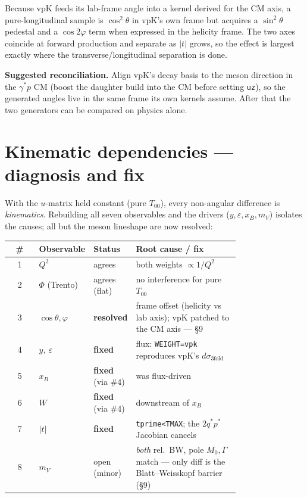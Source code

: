 \documentclass[11pt]{article}
\newcommand{\shadebox}[2][shade]{%
  \begingroup\setlength{\fboxsep}{10pt}%
  \noindent\colorbox{#1}{\parbox{\dimexpr\linewidth-2\fboxsep\relax}{#2}}%
  \endgroup\par\vspace{0.6em}}
\begin{document}
Because vpK feeds its lab-frame angle into a kernel derived for the CM axis, a pure-longitudinal sample is
$\cos^2\!\theta$ in vpK's own frame but acquires a $\sin^2\!\theta$ pedestal and a $\cos2\varphi$ term when
expressed in the helicity frame. The two axes coincide at forward production and separate as $|t|$ grows, so
the effect is largest exactly where the transverse/longitudinal separation is done.

\shadebox{\textbf{Suggested reconciliation.} Align vpK's decay basis to the meson direction in the
$\gamma^{*}p$ CM (boost the daughter build into the CM before setting \texttt{uz}), so the generated angles
live in the same frame its own kernels assume. After that the two generators can be compared on physics
alone.}

\section{Kinematic dependencies --- diagnosis and fix}
With the $u$-matrix held constant (pure $T_{00}$), every non-angular difference is \emph{kinematics}.
Rebuilding all seven observables and the drivers ($y,\varepsilon,x_B,m_V$) isolates the causes; all but the
meson lineshape are now resolved:

\begin{center}\small
\begin{tabular}{@{}cp{0.15\linewidth}p{0.17\linewidth}p{0.45\linewidth}@{}}
\toprule
\# & Observable & Status & Root cause \; / \; fix \\
\midrule
1 & $Q^2$ & agrees & both weights $\propto 1/Q^2$ \\
2 & $\Phi$ (Trento) & agrees (flat) & no interference for pure $T_{00}$ \\
3 & $\cos\theta,\varphi$ & \textbf{resolved} & frame offset (helicity vs lab axis); vpK patched to the CM axis --- \S9 \\
4 & $y,\ \varepsilon$ & \textbf{fixed} & flux: \texttt{WEIGHT=vpk} reproduces vpK's $d\sigma_{3\mathrm{fold}}$ \\
5 & $x_B$ & \textbf{fixed} (via \#4) & was flux-driven \\
6 & $W$ & \textbf{fixed} (via \#4) & downstream of $x_B$ \\
7 & $|t|$ & \textbf{fixed} & \texttt{tprime<TMAX}; the $2q^{*}p^{*}$ Jacobian cancels \\
8 & $m_V$ & open (minor) & \emph{both} rel.\ BW, pole $M_0,\Gamma$ match --- only diff is the Blatt--Weisskopf barrier (\S9) \\
\bottomrule
\end{tabular}
\end{center}
\end{document}
